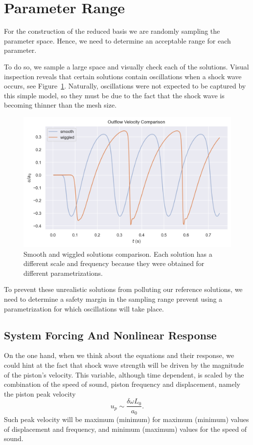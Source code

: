 \documentclass[../../thesis.tex]{subfiles}
\begin{document}
\section{Parameter Range}
For the construction of the reduced basis we are randomly sampling the parameter space.
Hence, we need to determine an acceptable range for each parameter.

To do so, we sample a large space and visually check each of the solutions.
Visual inspection reveals that certain solutions contain oscillations when a shock wave occurs, see Figure~\ref{fig:smooth_vs_wiggled}.
Naturally, oscillations were not expected to be captured by this simple model, 
so they must be due to the fact that the shock wave is becoming thinner than the mesh size.

\begin{figure}[h]
    \centering
    \includegraphics[width=1\columnwidth]{research_project/piston/figures/wiggles/smooth_vs_wiggled.png}
    \caption{Smooth and wiggled solutions comparison.
    Each solution has a different scale and frequency because they were obtained for different parametrizations.}
    \label{fig:smooth_vs_wiggled}
\end{figure}
To prevent these unrealistic solutions from polluting our reference solutions, we
need to determine a safety margin in the sampling range prevent using a parametrization for which oscillations will take place.


\subsection{System Forcing And Nonlinear Response}
\label{sec:fom_calibration_system_forcing}
On the one hand, when we think about the equations and their response, we could hint at the fact that shock wave strength will be driven by the magnitude of the piston's velocity.
This variable, although time dependent, is scaled by the combination of the speed of sound,
piston frequency and displacement, 
namely the piston peak velocity
\begin{equation}
    u_p \sim \frac{\delta \omega L_0}{a_0}.
\end{equation}
Such peak velocity will be maximum (minimum) for maximum (minimum) values of displacement and frequency, and minimum (maximum) values for the speed of sound.
\end{document}
